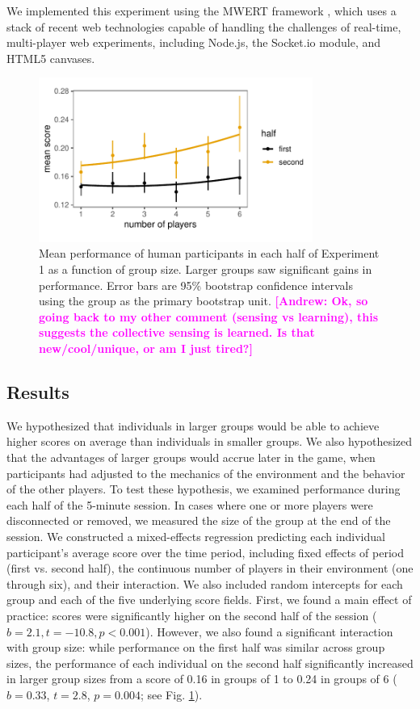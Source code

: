 \documentclass[12pt,letterpaper]{article}
\newcommand{\andrew}[1]{\textcolor{magenta}{\bf [Andrew: #1]}}
\begin{document}
We implemented this experiment using the MWERT framework \cite{hawkins_conducting_2014}, which uses a stack of recent web technologies capable of handling the challenges of real-time, multi-player web experiments, including Node.js, the Socket.io module, and HTML5 canvases.  

\begin{figure}[t!]
  \centering
  \includegraphics[width=0.8\textwidth]{./figures/performance-summary-exp1.pdf}
  \caption{Mean performance of human participants in each half of Experiment 1 as a function of group size. Larger groups saw significant gains in performance. Error bars are 95\% bootstrap confidence intervals using the group as the primary bootstrap unit. \andrew{Ok, so going back to my other comment (sensing vs learning), this suggests the collective sensing is learned. Is that new/cool/unique, or am I just tired?} }
  \label{fig:exp1_performance}
\end{figure}

\subsection{Results}

We hypothesized that individuals in larger groups would be able to achieve higher scores on average than individuals in smaller groups. 
We also hypothesized that the advantages of larger groups would accrue later in the game, when participants had adjusted to the mechanics of the environment and the behavior of the other players.
To test these hypothesis, we examined performance during each half of the 5-minute session. 
In cases where one or more players were disconnected or removed, we measured the size of the group at the end of the session.
We constructed a mixed-effects regression predicting each individual participant's average score over the time period, including fixed effects of period (first vs. second half), the continuous number of players in their environment (one through six), and their interaction.
We also included random intercepts for each group and each of the five underlying score fields.
First, we found a main effect of practice: scores were significantly higher on the second half of the session ($b = 2.1,t=-10.8, p < 0.001$).
However, we also found a significant interaction with group size: while performance on the first half was similar across group sizes, the performance of each individual on the second half significantly increased in larger group sizes from a score of 0.16 in groups of 1 to 0.24 in groups of 6 ($b = 0.33$, $t = 2.8$, $p = 0.004$; see Fig. \ref{fig:exp1_performance}). 
\end{document}

